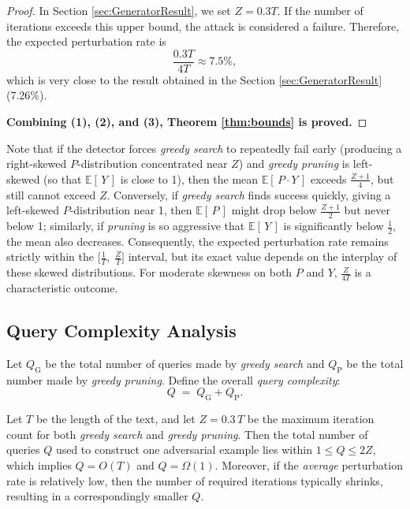 \begin{proof}
In Section \ref{sec:GeneratorResult}, we set \( Z = 0.3T \). If the number of iterations exceeds this upper bound, the attack is considered a failure. Therefore, the expected perturbation rate is\[
\frac{0.3T}{4T} \approx 7.5\%,\] which is very close to the result obtained in the Section \ref{sec:GeneratorResult} (7.26\%).

\noindent \textbf{Combining (1), (2), and (3), Theorem \ref{thm:bounds} is proved.}
\end{proof}

Note that if the detector forces \emph{greedy search} to repeatedly fail early (producing a right-skewed \(P\)-distribution concentrated near \(Z\)) and \emph{greedy pruning} is left-skewed (so that \(\mathbb{E}[\,Y\,]\) is close to 1), then the mean \(\mathbb{E}[\,P \cdot Y\,]\) exceeds \(\tfrac{Z+1}{4}\), but still cannot exceed \(Z\). Conversely, if \emph{greedy search} finds success quickly, giving a left-skewed \(P\)-distribution near 1, then \(\mathbb{E}[\,P\,]\) might drop below \(\tfrac{Z+1}{2}\) but never below 1; similarly, if \emph{pruning} is so aggressive that \(\mathbb{E}[\,Y\,]\) is significantly below \(\tfrac{1}{2}\), the mean also decreases. Consequently, the expected perturbation rate remains strictly within the \(\bigl[\tfrac{1}{T},\;\tfrac{Z}{T}\bigr]\) interval, but its exact value depends on the interplay of these skewed distributions. For moderate skewness on both \(P\) and \(Y\), \(\tfrac{Z}{4T}\) is a characteristic outcome.

\subsection{Query Complexity Analysis}

\noindent
\begin{definition}
\label{def:queries}
Let \(Q_{\mathrm{G}}\) be the total number of queries made by \emph{greedy search} and \(Q_{\mathrm{P}}\) be the total number made by \emph{greedy pruning}. Define the overall \emph{query complexity}:
\[
  Q \;=\; Q_{\mathrm{G}} + Q_{\mathrm{P}}.
\]
\end{definition}

\begin{theorem}
\label{thm:query_complexity_bounds}
Let \(T\) be the length of the text, and let \(Z = 0.3\,T\) be the maximum iteration count for both \emph{greedy search} and \emph{greedy pruning}. Then the total number of queries \(Q\) used to construct one adversarial example lies within \(1 \leq Q \leq 2Z\), which implies \(Q = O(T)\) and \(Q = \Omega(1)\). Moreover, if the \emph{average} perturbation rate is relatively low, then the number of required iterations typically shrinks, resulting in a correspondingly smaller \(Q\).
\end{theorem}



